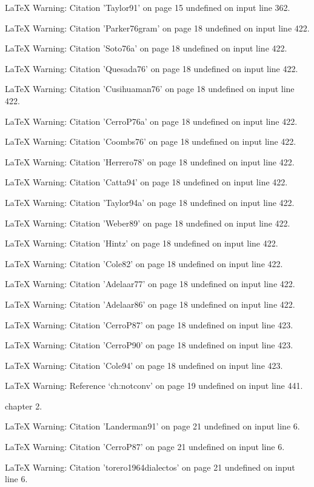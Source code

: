 LaTeX Warning: Citation 'Taylor91' on page 15 undefined on input line 362.


LaTeX Warning: Citation 'Parker76gram' on page 18 undefined on input line 422.


LaTeX Warning: Citation 'Soto76a' on page 18 undefined on input line 422.


LaTeX Warning: Citation 'Quesada76' on page 18 undefined on input line 422.


LaTeX Warning: Citation 'Cusihuaman76' on page 18 undefined on input line 422.


LaTeX Warning: Citation 'CerroP76a' on page 18 undefined on input line 422.


LaTeX Warning: Citation 'Coombs76' on page 18 undefined on input line 422.


LaTeX Warning: Citation 'Herrero78' on page 18 undefined on input line 422.


LaTeX Warning: Citation 'Catta94' on page 18 undefined on input line 422.


LaTeX Warning: Citation 'Taylor94a' on page 18 undefined on input line 422.


LaTeX Warning: Citation 'Weber89' on page 18 undefined on input line 422.


LaTeX Warning: Citation 'Hintz' on page 18 undefined on input line 422.


LaTeX Warning: Citation 'Cole82' on page 18 undefined on input line 422.


LaTeX Warning: Citation 'Adelaar77' on page 18 undefined on input line 422.


LaTeX Warning: Citation 'Adelaar86' on page 18 undefined on input line 422.


LaTeX Warning: Citation 'CerroP87' on page 18 undefined on input line 423.


LaTeX Warning: Citation 'CerroP90' on page 18 undefined on input line 423.


LaTeX Warning: Citation 'Cole94' on page 18 undefined on input line 423.


LaTeX Warning: Reference `ch:notconv' on page 19 undefined on input line 441.

chapter 2.

LaTeX Warning: Citation 'Landerman91' on page 21 undefined on input line 6.


LaTeX Warning: Citation 'CerroP87' on page 21 undefined on input line 6.


LaTeX Warning: Citation 'torero1964dialectos' on page 21 undefined on input line 6.


